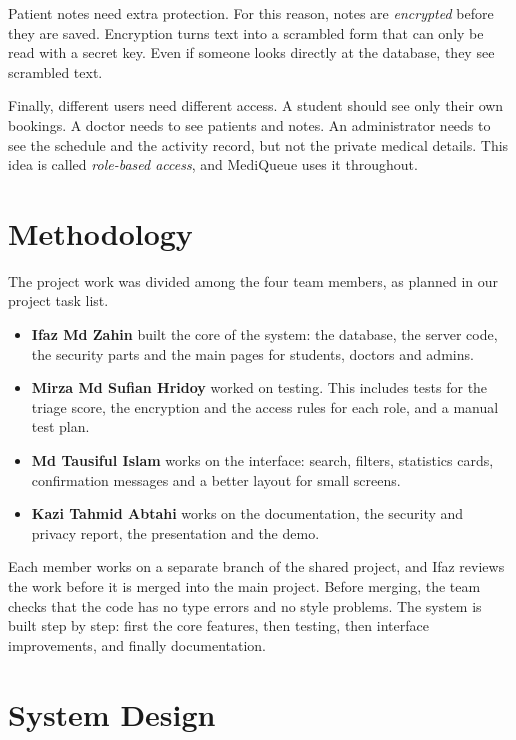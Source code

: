 \documentclass[12pt,a4paper]{article}
\begin{document}
Patient notes need extra protection. For this reason, notes are \emph{encrypted} before they are saved. Encryption turns text into a scrambled form that can only be read with a secret key. Even if someone looks directly at the database, they see scrambled text.

Finally, different users need different access. A student should see only their own bookings. A doctor needs to see patients and notes. An administrator needs to see the schedule and the activity record, but not the private medical details. This idea is called \emph{role-based access}, and MediQueue uses it throughout.

\section{Methodology}
The project work was divided among the four team members, as planned in our project task list.

\begin{itemize}
  \item \textbf{Ifaz Md Zahin} built the core of the system: the database, the server code, the security parts and the main pages for students, doctors and admins.
  \item \textbf{Mirza Md Sufian Hridoy} worked on testing. This includes tests for the triage score, the encryption and the access rules for each role, and a manual test plan.
  \item \textbf{Md Tausiful Islam} works on the interface: search, filters, statistics cards, confirmation messages and a better layout for small screens.
  \item \textbf{Kazi Tahmid Abtahi} works on the documentation, the security and privacy report, the presentation and the demo.
\end{itemize}

Each member works on a separate branch of the shared project, and Ifaz reviews the work before it is merged into the main project. Before merging, the team checks that the code has no type errors and no style problems. The system is built step by step: first the core features, then testing, then interface improvements, and finally documentation.

\section{System Design}
\end{document}
